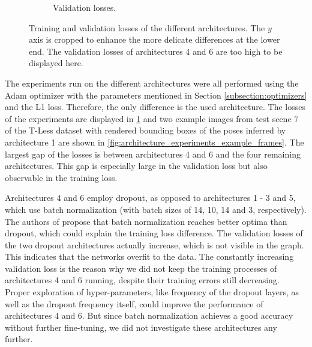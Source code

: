 \begin{figure}[!bbp]
\begin{subfigure}[t]{0.4\textwidth}
		\caption{Validation losses.}
	\end{subfigure}
	\caption{Training and validation losses of the different architectures. The $y$ axis is cropped to enhance the more delicate differences at the lower end. The validation losses of architectures 4 and 6 are too high to be displayed here.}
	\label{fig:experiments_architectures_loss}
\end{figure} 

The experiments run on the different architectures were all performed using the Adam optimizer with the parameters mentioned in Section \ref{subsection:optimizers} and the L1 loss. Therefore, the only difference is the used architecture. The losses of the experiments are displayed in \fig \ref{fig:experiments_architectures_loss} and two example images from test scene 7 of the T-Less dataset with rendered bounding boxes of the poses inferred by architecture 1 are shown in \fig \ref{fig:architecture_experiments_example_frames}. The largest gap of the losses is between architectures 4 and 6 and the four remaining architectures. This gap is especially large in the validation loss but also observable in the training loss. 

Architectures 4 and 6 employ dropout, as opposed to architectures 1 - 3 and 5, which use batch normalization (with batch sizes of 14, 10, 14 and 3, respectively). The authors of \cite{batch_normalization}  propose that batch normalization reaches better optima than dropout, which could explain the training loss difference. The validation losses of the two dropout architectures actually increase, which is not visible in the graph. This indicates that the networks overfit to the data. The constantly increasing validation loss is the reason why we did not keep the training processes of architectures 4 and 6 running, despite their training errors still decreasing. Proper exploration of hyper-parameters, like frequency of the dropout layers, as well as the dropout frequency itself, could improve the performance of architectures 4 and 6. But since batch normalization achieves a good accuracy without further fine-tuning, we did not investigate these architectures any further.

